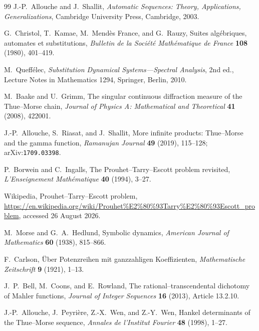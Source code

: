 \documentclass[11pt,oneside]{article}
\numberwithin{equation}{section}
\theoremstyle{definition}
\theoremstyle{remark}
\begin{document}
\begin{thebibliography}{99}
J.-P.~Allouche and J.~Shallit,
\newblock \emph{Automatic Sequences: Theory, Applications, Generalizations},
\newblock Cambridge University Press, Cambridge, 2003.

G.~Christol, T.~Kamae, M.~Mend\`es France, and G.~Rauzy,
\newblock Suites alg\'ebriques, automates et substitutions,
\newblock \emph{Bulletin de la Soci\'et\'e Math\'ematique de France}
\textbf{108} (1980), 401--419.

M.~Queff\'elec,
\newblock \emph{Substitution Dynamical Systems---Spectral Analysis},
2nd ed., Lecture Notes in Mathematics 1294,
\newblock Springer, Berlin, 2010.

M.~Baake and U.~Grimm,
\newblock The singular continuous diffraction measure of the Thue--Morse chain,
\newblock \emph{Journal of Physics A: Mathematical and Theoretical}
\textbf{41} (2008), 422001.

J.-P.~Allouche, S.~Riasat, and J.~Shallit,
\newblock More infinite products: Thue--Morse and the gamma function,
\newblock \emph{Ramanujan Journal} \textbf{49} (2019), 115--128;
\newblock arXiv:\nolinkurl{1709.03398}.

P.~Borwein and C.~Ingalls,
\newblock The Prouhet--Tarry--Escott problem revisited,
\newblock \emph{L'Enseignement Math\'ematique} \textbf{40} (1994), 3--27.

Wikipedia,
\newblock Prouhet--Tarry--Escott problem,
\newblock \url{https://en.wikipedia.org/wiki/Prouhet%E2%80%93Tarry%E2%80%93Escott_problem},
accessed 26 August 2026.

M.~Morse and G.~A.~Hedlund,
\newblock Symbolic dynamics,
\newblock \emph{American Journal of Mathematics} \textbf{60} (1938),
815--866.

F.~Carlson,
\newblock \"Uber Potenzreihen mit ganzzahligen Koeffizienten,
\newblock \emph{Mathematische Zeitschrift} \textbf{9} (1921), 1--13.

J.~P.~Bell, M.~Coons, and E.~Rowland,
\newblock The rational--transcendental dichotomy of Mahler functions,
\newblock \emph{Journal of Integer Sequences} \textbf{16} (2013),
Article 13.2.10.

J.-P.~Allouche, J.~Peyri\`ere, Z.-X.~Wen, and Z.-Y.~Wen,
\newblock Hankel determinants of the Thue--Morse sequence,
\newblock \emph{Annales de l'Institut Fourier} \textbf{48} (1998), 1--27.


\end{thebibliography}
\end{document}
